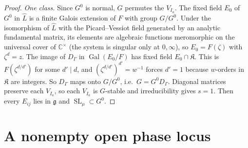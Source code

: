 \documentclass[11pt]{article}
\numberwithin{equation}{section}
\theoremstyle{definition}
\theoremstyle{remark}
\newcommand{\C}{\mathbb C}
\newcommand{\Gal}{\operatorname{Gal}}
\newcommand{\SL}{\operatorname{SL}}
\begin{document}
\begin{proof}
\emph{One class.} Since $G^0$ is normal, $G$ permutes the $V_{I_a}$. The fixed
field $E_0$ of $G^0$ in $\widehat L$ is a finite Galois extension of $F$ with
group $G/G^0$. Under the isomorphism of $\widehat L$ with the Picard--Vessiot
field generated by an analytic fundamental matrix, its elements are algebraic
functions meromorphic on the universal cover of $\C^\times$ (the system is
singular only at $0,\infty$), so $E_0=F(\zeta)$ with $\zeta^d=z$. The image of
$D_\Gamma$ in $\Gal(E_0/F)$ has fixed field $E_0\cap\mathfrak K$. This is
$F(\zeta^{d/d'})$ for some $d'\mid d$, and
$(\zeta^{d/d'})^{d'}=w^{-1}$ forces $d'=1$ because $w$-orders in $\mathfrak K$
are integers. So $D_\Gamma$ maps onto $G/G^0$, i.e.\ $G=G^0D_\Gamma$. Diagonal
matrices preserve each $V_{I_a}$, so each $V_{I_a}$ is $G$-stable and
irreducibility gives $s=1$. Then every $E_{ij}$ lies in $\mathfrak g$ and
$\SL_\mu\subset G^0$.
\end{proof}

\section{A nonempty open phase locus}\label{sec:root-locus}
\end{document}
